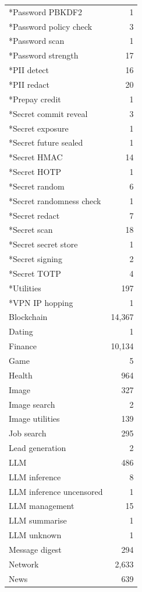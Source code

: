 \begin{table}[htbp]
\begin{tabular}{lr}
    *Password PBKDF2 & 1 \\
    *Password policy check & 3 \\
    *Password scan & 1 \\
    *Password strength & 17 \\
    *PII detect & 16 \\
    *PII redact & 20 \\
    *Prepay credit & 1 \\
    *Secret commit reveal & 3 \\
    *Secret exposure & 1 \\
    *Secret future sealed & 1 \\
    *Secret HMAC & 14 \\
    *Secret HOTP & 1 \\
    *Secret random & 6 \\
    *Secret randomness check & 1 \\
    *Secret redact & 7 \\
    *Secret scan & 18 \\
    *Secret secret store & 1 \\
    *Secret signing & 2 \\
    *Secret TOTP & 4 \\
    *Utilities & 197 \\
    *VPN IP hopping & 1 \\
    Blockchain & 14,367 \\
    Dating & 1 \\
    Finance & 10,134 \\
    Game & 5 \\
    Health & 964 \\
    Image & 327 \\
    Image search & 2 \\
    Image utilities & 139 \\
    Job search & 295 \\
    Lead generation & 2 \\
    LLM & 486 \\
    LLM inference & 8 \\
    LLM inference uncensored & 1 \\
    LLM management & 15 \\
    LLM summarise & 1 \\
    LLM unknown & 1 \\
    Message digest & 294 \\
    Network & 2,633 \\
    News & 639 \\

\end{tabular}
\end{table}
